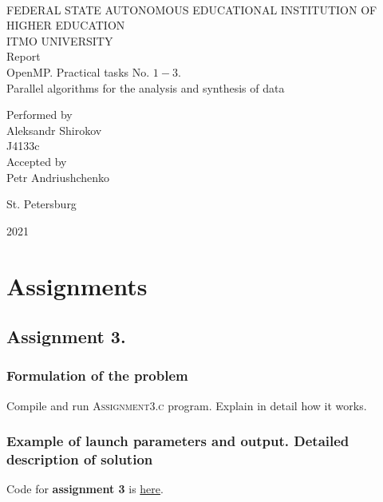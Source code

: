\documentclass[%
12pt, %
final, %
oneside, %
onecolumn, %
centertags]{article} %
\theoremstyle{plain}
\theoremstyle{definition}
\theoremstyle{remark}
\begin{document}
	\begin{titlepage} 
		\begin{center}
		\textbf{}\\[2.0cm]
		\LARGE FEDERAL STATE AUTONOMOUS EDUCATIONAL INSTITUTION OF HIGHER EDUCATION \\[0.5cm]
		\Large ITMO UNIVERSITY \\[3cm]
		\LARGE Report\\
		\Large OpenMP. Practical tasks No. $1-3$. \\
		\Large Parallel algorithms for the analysis and synthesis of data \\[4cm]


		\begin{flushright}
		Performed by\\
		Aleksandr Shirokov\\
		J4133c\\
		Accepted by\\
		Petr Andriushchenko
		\end{flushright}

		\vfill 

		{\Large {St. Petersburg}} \par
		{\Large {2021}}
		\end{center} 
	\end{titlepage}

\tableofcontents
\newpage


\section{Assignments}

\subsection{Assignment 3.}

\subsubsection{Formulation of the problem}

Compile and run \textsc{Assignment3.c} program. Explain in detail how it works.

\subsubsection{Example of launch parameters and output. Detailed description of solution}

Code for \textbf{assignment 3} is \href{https:\//github.com/aptmess/parallel_algorithms/blob/master/HT/hw_mpi/Assignment3.c}{here}.
\end{document}
